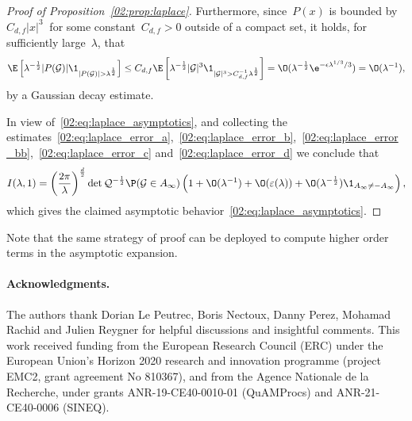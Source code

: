 \begin{proof}[Proof of Proposition~\ref{02:prop:laplace}]
            Furthermore, since~$P(x)$ is bounded by~$C_{d,f}|x|^{3}~$ for some constant~$C_{d,f}>0$ outside of a compact set, it holds, for sufficiently large~$\lambda$, that
            \begin{equation}
                \label{02:eq:laplace_error_d}
                \E\left[\lambda^{-\frac12}|P({\mathcal G})|\1_{|P({\mathcal G})|>\lambda^{\frac12}}\right] \leq C_{d,f}\E\left[\lambda^{-\frac12}|{\mathcal G}|^3 \1_{|{\mathcal G}|^3>C_{d,f}^{-1}\lambda^{\frac12}}\right] = \O(\lambda^{-\frac12}\e^{-\epsilon\lambda^{1/3}/3})=\O(\lambda^{-1}),
            \end{equation}
            by a Gaussian decay estimate.

            In view of~\eqref{02:eq:laplace_asymptotics}, and collecting the estimates~\eqref{02:eq:laplace_error_a},~\eqref{02:eq:laplace_error_b},~\eqref{02:eq:laplace_error_bb},~\eqref{02:eq:laplace_error_c} and~\eqref{02:eq:laplace_error_d} we conclude that
            \begin{equation}
                I(\lambda,1) = \left(\frac{2\pi}{\lambda}\right)^{\frac d2}\det \mathcal Q^{-\frac12}\P({\mathcal G} \in A_\infty)\left(1+\O(\lambda^{-1})+\O(\varepsilon(\lambda))+ \O(\lambda^{-\frac 12})\1_{A_\infty \neq - A_\infty}\right),
            \end{equation}
            which gives the claimed asymptotic behavior~\eqref{02:eq:laplace_asymptotics}.
        \end{proof}
        Note that the same strategy of proof can be deployed to compute higher order terms in the asymptotic expansion.

    \paragraph{Acknowledgments.}
    The authors thank Dorian Le Peutrec, Boris Nectoux, Danny Perez, Mohamad Rachid and Julien Reygner for helpful discussions and insightful comments.
    This work received funding from the European Research Council (ERC) under the
    European Union's Horizon 2020 research and innovation programme (project
    EMC2, grant agreement No 810367), and from the Agence Nationale de la
    Recherche, under grants ANR-19-CE40-0010-01 (QuAMProcs) and
    ANR-21-CE40-0006 (SINEQ).
